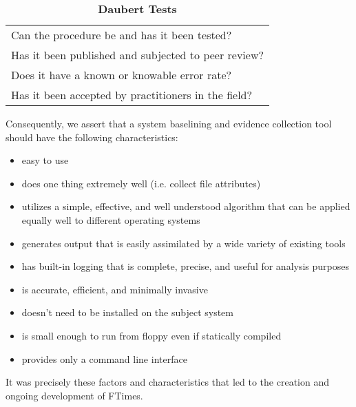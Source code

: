 \documentclass[10pt]{article}
\begin{document}
\begin{table}[h]
\begin{center}
\caption{\bf Daubert Tests\label{tbl:daubert}}\vspace{.2em}
\begin{tabular}{l}\hline
  Can the procedure be and has it been tested? \\
  Has it been published and subjected to peer review? \\
  Does it have a known or knowable error rate? \\
  Has it been accepted by practitioners in the field? \\
\end{tabular}
\end{center}
\end{table}

Consequently, we assert that a system baselining and
evidence collection tool should have the following characteristics:

\begin{itemize}

  \item
  easy to use

  \item
  does one thing extremely well (i.e. collect file attributes)

  \item
  utilizes a simple, effective, and well understood algorithm that
  can be applied equally well to different operating systems

  \item
  generates output that is easily assimilated by a wide variety of
  existing tools

  \item
  has built-in logging that is complete, precise, and useful for
  analysis purposes

  \item
  is accurate, efficient, and minimally invasive

  \item
  doesn't need to be installed on the subject system

  \item
  is small enough to run from floppy even if statically compiled

  \item
  provides only a command line interface

\end{itemize}

It was precisely these factors and characteristics that led
to the creation and ongoing development of FTimes.
\end{document}
